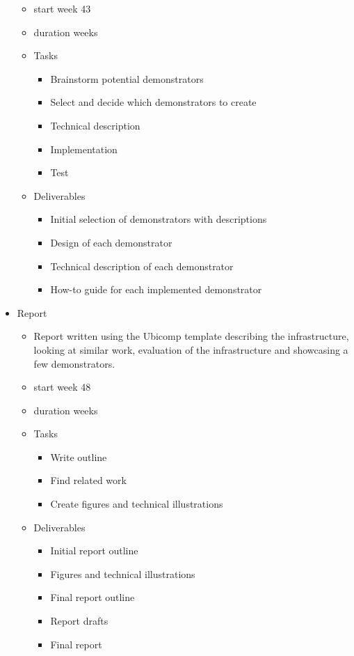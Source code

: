\documentclass{sigchi}
\begin{document}
\begin{itemize}
\begin{itemize}
    \item start week 43
    \item duration weeks
    \item Tasks
        \begin{itemize}
        \item Brainstorm potential demonstrators
        \item Select and decide which demonstrators to create
        \item Technical description
        \item Implementation
        \item Test
        \end{itemize}
    \item Deliverables
        \begin{itemize}
        \item Initial selection of demonstrators with descriptions
        \item Design of each demonstrator
        \item Technical description of each demonstrator
        \item How-to guide for each implemented demonstrator
        \end{itemize}
    \end{itemize}
\item Report
    \begin{itemize}
    \item Report written using the Ubicomp template describing the infrastructure, looking at similar work, evaluation of the infrastructure and showcasing a few demonstrators.
    \item start week 48
    \item duration weeks
    \item Tasks
        \begin{itemize}
        \item Write outline
        \item Find related work
        \item Create figures and technical illustrations
        \end{itemize}
    \item Deliverables
        \begin{itemize}
        \item Initial report outline
        \item Figures and technical illustrations
        \item Final report outline
        \item Report drafts
        \item Final report
        \end{itemize}
    \end{itemize}
\end{itemize}
\end{document}
